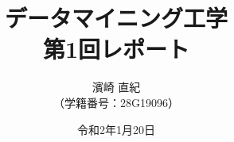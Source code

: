 \documentclass[a4paper]{jsarticle}
\title{\Huge データマイニング工学\\\huge 第1回レポート\vspace{120mm}}
\author{\Large 濱崎 直紀\\\large （学籍番号：28G19096）\vspace{25mm}}
\date{令和2年1月20日}
\begin{document}
\begin{titlepage}
\maketitle
\thispagestyle{empty}
\end{titlepage}




\end{document}
